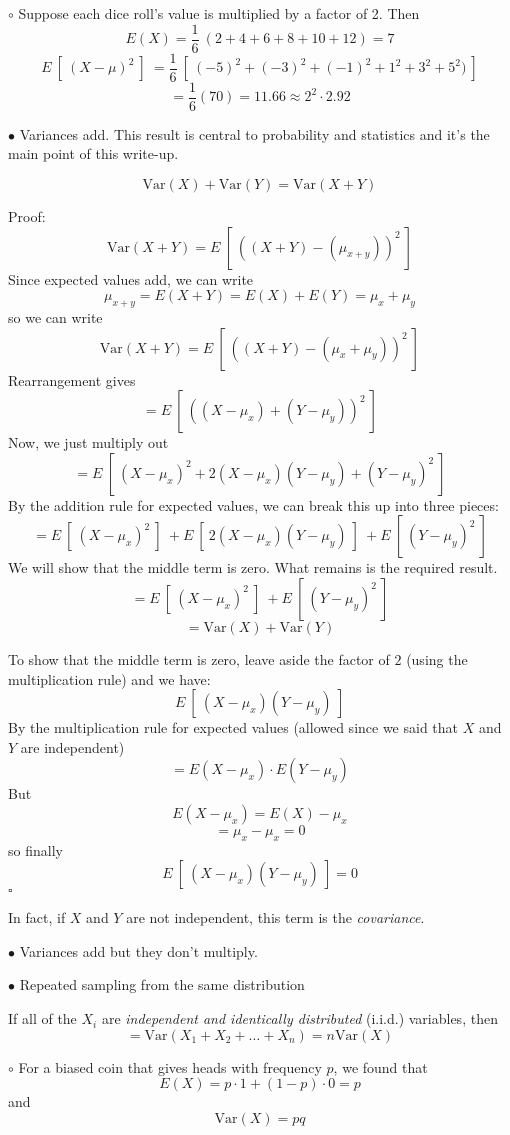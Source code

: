 \documentclass[11pt, oneside]{article}
\begin{document}
$\circ$ Suppose each dice roll's value is multiplied by a factor of 2.  Then
\[ E(X) = \frac{1}{6} \ (2 + 4 + 6 + 8 + 10 + 12) = 7 \]
\[ E \ [ \ (X - \mu)^2 \ ] \ = \frac{1}{6} \ [ \  (-5)^2 + (-3)^2 + (-1)^2 + 1^2 + 3^2 + 5^2) \ ]  \]
\[ = \frac{1}{6} (70) = 11.66 \approx 2^2 \cdot 2.92 \]

$\bullet$ Variances add.  This result is central to probability and statistics and it's the main point of this write-up.

\[ \text{Var}(X) + \text{Var}(Y) = \text{Var}(X + Y) \]

Proof:
\[ \text{Var}(X + Y) = E \ [ \ ((X + Y) - (\mu_{x + y}) )^2  \ ]  \]
Since expected values add, we can write 
\[ \mu_{x+y} = E(X+Y) = E(X) + E(Y) = \mu_x + \mu_y \]
so we can write
\[ \text{Var}(X + Y) = E \ [ \ ((X + Y) - (\mu_x + \mu_y) )^2  \ ]  \]
Rearrangement gives
\[ = E \ [ \ ((X - \mu_x) + (Y - \mu_y) )^2  \ ]  \]
Now, we just multiply out
\[ = E \ [ \ (X - \mu_x)^2 + 2( X - \mu_x) (Y - \mu_y) + (Y - \mu_y)^2  \ ]  \]
By the addition rule for expected values, we can break this up into three pieces:
\[ = E \ [ \ (X - \mu_x)^2 \ ] \ + E \ [ \ 2( X - \mu_x) (Y - \mu_y) \ ] \ + E \ [ \ (Y - \mu_y)^2  \ ]  \]
We will show that the middle term is zero.  What remains is the required result.
\[ = E \ [ \ (X - \mu_x)^2 \ ] \ + E \ [ \ (Y - \mu_y)^2  \ ]  \]
\[ = \text{Var}(X) + \text{Var}(Y) \]

To show that the middle term is zero, leave aside the factor of $2$ (using the multiplication rule) and we have:
\[ E \ [ \ (X - \mu_x) (Y - \mu_y) \ ] \]
By the multiplication rule for expected values (allowed since we said that $X$ and $Y$ are independent)
\[ = E(X - \mu_x) \cdot E(Y - \mu_y) \]
But 
\[ E(X - \mu_x) = E(X) - \mu_x \]
\[= \mu_x - \mu_x = 0 \]
so finally
\[ E \ [ \ (X - \mu_x) (Y - \mu_y) \ ] = 0 \]
$\square$

In fact, if $X$ and $Y$ are not independent, this term is the \emph{covariance}.

$\bullet$ Variances add but they don't multiply.

$\bullet$ Repeated sampling from the same distribution

If all of the $X_i$ are \emph{independent and identically distributed} (i.i.d.) variables, then
\[ = \text{Var}(X_1 + X_2 + \dots  + X_n) = n \text{Var}(X) \]

$\circ$ For a biased coin that gives heads with frequency $p$, we found that
\[ E(X) = p \cdot 1 + (1-p) \cdot 0 = p \]
and
\[ \text{Var}(X) = pq \]
\end{document}
